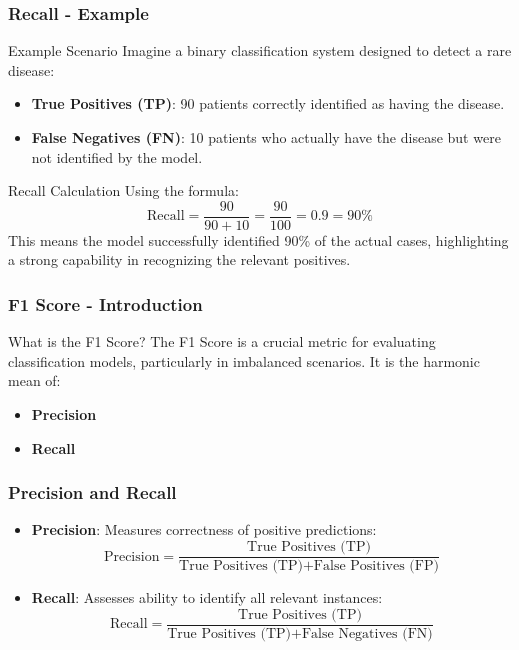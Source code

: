 \documentclass[aspectratio=169]{beamer}
\begin{document}
\begin{frame}[fragile]
    \frametitle{Recall - Example}
    \begin{block}{Example Scenario}
        Imagine a binary classification system designed to detect a rare disease:
        \begin{itemize}
            \item \textbf{True Positives (TP)}: 90 patients correctly identified as having the disease.
            \item \textbf{False Negatives (FN)}: 10 patients who actually have the disease but were not identified by the model.
        \end{itemize}
    \end{block}
    
    \begin{block}{Recall Calculation}
        Using the formula:
        \[
        \text{Recall} = \frac{90}{90 + 10} = \frac{90}{100} = 0.9 = 90\%
        \]
        This means the model successfully identified 90\% of the actual cases, highlighting a strong capability in recognizing the relevant positives.
    \end{block}
\end{frame}

\begin{frame}[fragile]
    \frametitle{F1 Score - Introduction}
    \begin{block}{What is the F1 Score?}
        The F1 Score is a crucial metric for evaluating classification models, particularly in imbalanced scenarios. It is the harmonic mean of:
        \begin{itemize}
            \item \textbf{Precision}
            \item \textbf{Recall}
        \end{itemize}
    \end{block}
\end{frame}

\begin{frame}[fragile]
    \frametitle{Precision and Recall}
    \begin{itemize}
        \item \textbf{Precision}: Measures correctness of positive predictions:
        \begin{equation}
            \text{Precision} = \frac{\text{True Positives (TP)}}{\text{True Positives (TP)} + \text{False Positives (FP)}}
        \end{equation}
        
        \item \textbf{Recall}: Assesses ability to identify all relevant instances:
        \begin{equation}
            \text{Recall} = \frac{\text{True Positives (TP)}}{\text{True Positives (TP)} + \text{False Negatives (FN)}}
        \end{equation}
    \end{itemize}
\end{frame}
\end{document}
